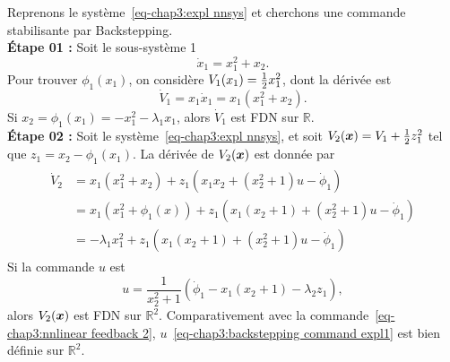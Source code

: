 \begin{example}
	Reprenons le système~\eqref{eq-chap3:expl nnsys} et cherchons une commande stabilisante par Backstepping. \\
	\textbf{Étape 01 :} Soit le sous-système 1 
	\begin{equation}
		\dot{x}_1 = x_1^2 + x_2.
	\end{equation}
	Pour trouver $\phi_1(x_1)$, on considère $V_1(x_1)= \frac{1}{2} x_1^2$, dont la dérivée est 
	\begin{equation}
		\dot{V}_1 = x_1\dot{x}_1 = x_1\left(x_1^2 + x_2\right).
	\end{equation}
	Si $x_2=\phi_1(x_1) = -x_1^2-\lambda_1x_1$, alors $\dot{V}_1$ est FDN sur $\mathbb{R}$. \\
	\textbf{Étape 02 :} Soit le système~\eqref{eq-chap3:expl nnsys}, et soit $V_2(\bm{x}) = V_1 + \frac{1}{2} z_1^2$ tel que $z_1 = x_2-\phi_1(x_1)$. La dérivée de $V_2(\bm{x})$ est donnée par 
	\begin{align}
		\begin{split}
			\dot{V}_2 &= x_1\left(x_1^2 + x_2\right) + z_1\left(x_1x_2 + (x_2^2+1)u - \dot{\phi}_1\right) \\
			&= x_1\left(x_1^2 + \phi_1(x)\right) + z_1\left(x_1(x_2+1) + (x_2^2+1)u - \dot{\phi}_1\right) \\
			&=-\lambda_1x_1^2 + z_1\left(x_1(x_2+1) + (x_2^2+1)u - \dot{\phi}_1\right)
		\end{split}
	\end{align}
	Si la commande $u$ est 
	\begin{equation}\label{eq-chap3:backstepping command expl1}
		u = \frac{1}{x_2^2+1}\left(\dot{\phi}_1 - x_1(x_2+1) - \lambda_2z_1\right),
	\end{equation}
	alors $V_2(\bm{x})$ est FDN sur $\mathbb{R}^2$. Comparativement avec la commande~\eqref{eq-chap3:nnlinear feedback 2}, $u$~\eqref{eq-chap3:backstepping command expl1} est bien définie sur $\mathbb{R}^2$.
\end{example}

